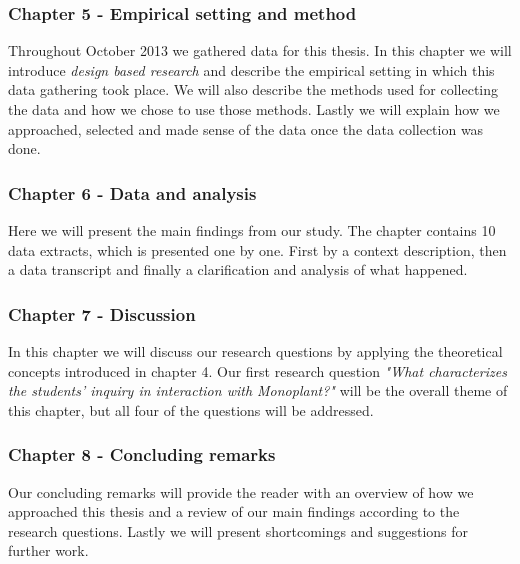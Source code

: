\subsubsection*{Chapter 5 - Empirical setting and method}

Throughout October 2013 we gathered data for this thesis. In this chapter we will introduce \emph{design based research} and describe the empirical setting in which this data gathering took place. We will also describe the methods used for collecting the data and how we chose to use those methods. Lastly we will explain how we approached, selected and made sense of the data once the data collection was done. 

\subsubsection*{Chapter 6 - Data and analysis}
Here we will present the main findings from our study. The chapter contains 10 data extracts, which is presented one by one. First by a context description, then a data transcript and finally a clarification and analysis of what happened. 

\subsubsection*{Chapter 7 - Discussion}
In this chapter we will discuss our research questions by applying the theoretical concepts introduced in chapter 4. Our first research question \emph{"What characterizes the students’ inquiry in interaction with Monoplant?"} will be the overall theme of this chapter, but all four of the questions will be addressed.

\subsubsection*{Chapter 8 - Concluding remarks}
Our concluding remarks will provide the reader with an overview of how we approached this thesis and a review of our main findings according to the research questions. Lastly we will present shortcomings and suggestions for further work.